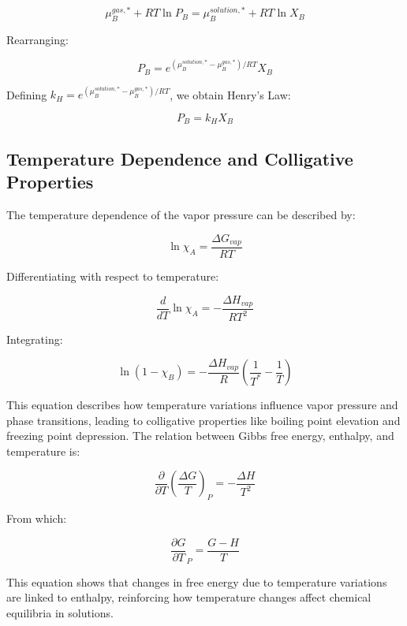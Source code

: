 \documentclass{article}
\theoremstyle{definition}
\begin{document}
\begin{equation}
\mu_B^{gas,*} + RT \ln P_B = \mu_B^{solution,*} + RT \ln X_B
\end{equation}

Rearranging:

\begin{equation}
P_B = e^{(\mu_B^{solution,*} - \mu_B^{gas,*}) / RT} X_B
\end{equation}

Defining $k_H = e^{(\mu_B^{solution,*} - \mu_B^{gas,*}) / RT}$, we obtain Henry’s Law:

\begin{equation}
P_B = k_H X_B
\end{equation}

\subsection{Temperature Dependence and Colligative Properties}

The temperature dependence of the vapor pressure can be described by:

\begin{equation}
\ln{\chi_A} = \frac{\Delta G_{vap}}{RT}
\end{equation}

Differentiating with respect to temperature:

\begin{equation}
\frac{d}{dT} \ln{\chi_A} = - \frac{\Delta H_{vap}}{RT^2}
\end{equation}

Integrating:

\begin{equation}
\ln(1 - \chi_B) = -\frac{\Delta H_{vap}}{R} \left( \frac{1}{T^*} - \frac{1}{T} \right)
\end{equation}

This equation describes how temperature variations influence vapor pressure and phase transitions, leading to colligative properties like boiling point elevation and freezing point depression. The relation between Gibbs free energy, enthalpy, and temperature is:

\begin{equation}
\frac{\partial}{\partial T} \left( \frac{\Delta G}{T} \right)_P = - \frac{\Delta H}{T^2}
\end{equation}

From which:

\begin{equation}
\frac{\partial G}{\partial T}_P = \frac{G - H}{T}
\end{equation}

This equation shows that changes in free energy due to temperature variations are linked to enthalpy, reinforcing how temperature changes affect chemical equilibria in solutions.
\end{document}
